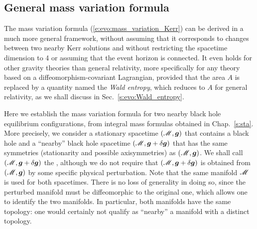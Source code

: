 \subsection{General mass variation formula} \label{s:evo:gen_mass_variation}

The mass variation formula (\ref{e:evo:mass_variation_Kerr}) can be derived in
a much more general framework, without assuming that it corresponds to changes between
two nearby Kerr solutions and without restricting
the spacetime dimension to 4 or assuming that the event horizon is connected.
It even holds for other gravity theories than general relativity, more specifically
for any theory based on a diffeomorphism-covariant Lagrangian, provided that
the area $A$ is replaced by a quantity named the \emph{Wald entropy}, which reduces to $A$ for general relativity, as we shall discuss in Sec.~\ref{s:evo:Wald_entropy}.

Here we establish the mass variation formula for two nearby black hole
equilibrium configurations, from integral mass formulas obtained in Chap.~\ref{s:sta}.
More precisely, we consider a stationary spacetime $(\mathscr{M},\bm{g})$ that contains
a black hole and a ``nearby'' black hole spacetime $(\mathscr{M},\bm{g}+\delta\bm{g})$ that has the
same symmetries (stationarity and possible axisymmetries) as $(\mathscr{M},\bm{g})$.
We shall call $(\mathscr{M},\bm{g}+\delta\bm{g})$ the ,
although we do not require that $(\mathscr{M},\bm{g}+\delta\bm{g})$ is obtained from
$(\mathscr{M},\bm{g})$ by some specific physical perturbation.
Note that the same manifold $\mathscr{M}$ is used for both spacetimes.
There is no loss of generality in doing so, since the perturbed manifold
must be diffeomorphic to the original one, which allows one to
identify the two manifolds. In particular, both manifolds have the same
topology: one would certainly not qualify as ``nearby'' a manifold with a distinct topology.


